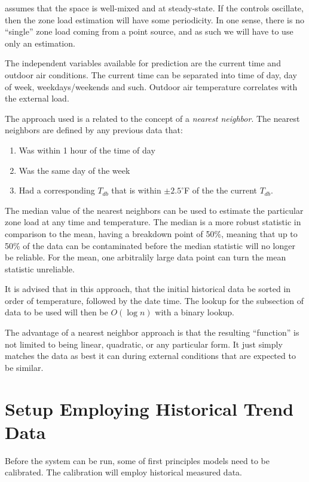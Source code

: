 assumes that the space is well-mixed and at steady-state. If the controls oscillate, then the zone load estimation will have some periodicity. In one sense, there is no ``single'' zone load coming from a point source, and as such we will have to use only an estimation.

The independent variables available for prediction are the current time and outdoor air conditions. The current time can be separated into time of day, day of week, weekdays/weekends and such. Outdoor air temperature correlates with the external load. 

The approach used is a related to the concept of a \textit{nearest neighbor}. The nearest neighbors are defined by any previous data that:

\begin{enumerate}
\item Was within 1 hour of the time of day 
\item Was the same day of the week
\item Had a corresponding \(T_{db}\) that is within \(\pm 2.5^\circ\)F of the the current \(T_{db}\). 
\end{enumerate}

The median value of the nearest neighbors can be used to estimate the particular zone load at any time and temperature.  The median is a more robust statistic in comparison to the mean, having a breakdown point of 50\%, meaning that up to 50\% of the data can be contaminated before the median statistic will no longer be reliable. For the mean, one arbitralily large data point can turn the mean statistic unreliable. 

It is advised that in this approach, that the initial historical data be sorted in order of temperature, followed by the date time.  The lookup for the subsection of data to be used will then be \(O\left(\log n \right)\) with a binary lookup. 

The advantage of a nearest neighbor approach is that the resulting ``function'' is not limited to being linear, quadratic, or any particular form. It just simply matches the data as best it can during external conditions that are expected to be similar.

\section{Setup Employing Historical Trend Data}

Before the system can be run, some of first principles models need to be calibrated. The calibration will employ historical measured data.

